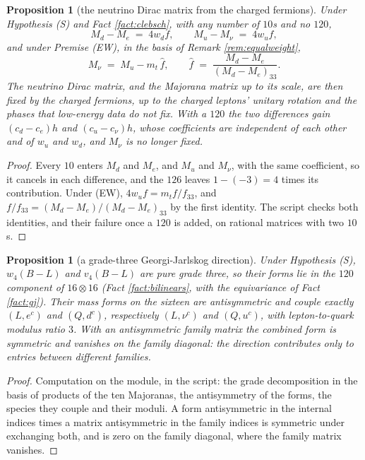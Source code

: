 \documentclass[11pt]{article}
\newtheorem{proposition}[theorem]{Proposition}
\theoremstyle{definition}
\begin{document}
\begin{proposition}[the neutrino Dirac matrix from the charged fermions]\label{prop:elimination}
Under Hypothesis (S) and Fact \ref{fact:clebsch}, with any number of $10$s and no $120$,
\[
M_{d} - M_{e} \;=\; 4w_{d}f, \qquad M_{u} - M_{\nu} \;=\; 4w_{u}f,
\]
and under Premise (EW), in the basis of Remark \ref{rem:equalweight},
\[
M_{\nu} \;=\; M_{u} - m_{t}\,\hat{f}, \qquad \hat{f} \;=\; \frac{M_{d} - M_{e}}{(M_{d} - M_{e})_{33}}.
\]
The neutrino Dirac matrix, and the Majorana matrix up to its scale, are then fixed by the charged fermions, up to the charged leptons' unitary rotation and the phases that low-energy data do not fix. With a $120$ the two differences gain $(c_{d} - c_{e})h$ and $(c_{u} - c_{\nu})h$, whose coefficients are independent of each other and of $w_{u}$ and $w_{d}$, and $M_{\nu}$ is no longer fixed.
\end{proposition}

\begin{proof}
Every $10$ enters $M_{d}$ and $M_{e}$, and $M_{u}$ and $M_{\nu}$, with the same coefficient, so it cancels in each difference, and the $126$ leaves $1 - (-3) = 4$ times its contribution. Under (EW), $4w_{u}f = m_{t}f/f_{33}$, and $f/f_{33} = (M_{d} - M_{e})/(M_{d} - M_{e})_{33}$ by the first identity. The script checks both identities, and their failure once a $120$ is added, on rational matrices with two $10$s.
\end{proof}

\begin{proposition}[a grade-three Georgi-Jarlskog direction]\label{prop:gradethree}
Under Hypothesis (S), $w_{4}(B - L)$ and $v_{4}(B - L)$ are pure grade three, so their forms lie in the $120$ component of $16 \otimes 16$ (Fact \ref{fact:bilinears}, with the equivariance of Fact \ref{fact:gj}). Their mass forms on the sixteen are antisymmetric and couple exactly $(L, e^{c})$ and $(Q, d^{c})$, respectively $(L, \nu^{c})$ and $(Q, u^{c})$, with lepton-to-quark modulus ratio $3$. With an antisymmetric family matrix the combined form is symmetric and vanishes on the family diagonal: the direction contributes only to entries between different families.
\end{proposition}

\begin{proof}
Computation on the module, in the script: the grade decomposition in the basis of products of the ten Majoranas, the antisymmetry of the forms, the species they couple and their moduli. A form antisymmetric in the internal indices times a matrix antisymmetric in the family indices is symmetric under exchanging both, and is zero on the family diagonal, where the family matrix vanishes.
\end{proof}
\end{document}
